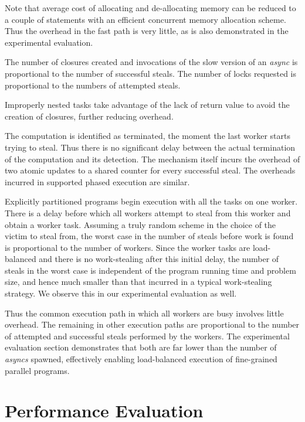 \documentclass[10pt]{article}
\numberwithin{equation}{section}
\begin{document}
Note that average cost of allocating and de-allocating memory can be
reduced to a couple of statements with an efficient concurrent memory
allocation scheme. Thus the overhead in the fast path is very
little, as is also demonstrated in the experimental evaluation.

The number of closures created and invocations of the slow version of
an \emph{async} is proportional to the number of successful steals. The
number of locks requested is proportional to the numbers of attempted
steals. 

Improperly nested tasks take advantage of the lack of return value to
avoid the creation of closures, further reducing overhead. 

The computation is identified as terminated, the moment the last
worker starts trying to steal. Thus there is no significant delay
between the actual termination of the computation and its detection.
The mechanism itself incurs the overhead of two atomic updates to a
shared counter for every successful steal. The overheads incurred in
supported phased execution are similar.

Explicitly partitioned programs begin execution with all the tasks on
one worker. There is a delay before which all workers attempt to steal
from this worker and obtain a worker task. Assuming a truly random
scheme in the choice of the victim to steal from, the worst case in
the number of steals before work is found is proportional to the
number of workers. Since the worker tasks are load-balanced and there
is no work-stealing after this initial delay, the number of steals in
the worst case is independent of the program running time and problem
size, and hence much smaller than that incurred in a typical
work-stealing strategy. We observe this in our experimental evaluation
as well. 


Thus the common execution path in which all workers are busy involves
little overhead. The remaining in other execution paths are
proportional to the number of attempted and successful steals
performed by the workers. The experimental evaluation section
demonstrates that both are far lower than the number of \emph{asyncs}
spawned, effectively enabling load-balanced execution of fine-grained
parallel programs.

\section{Performance Evaluation}\label{s:results}
\end{document}
